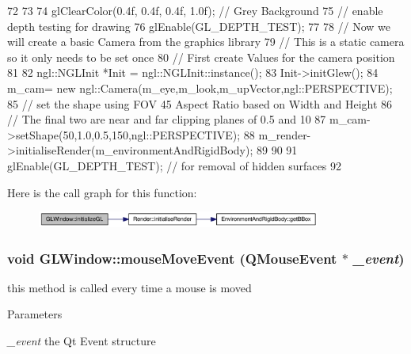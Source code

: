 \begin{DoxyCode}
72 {
73 
74   glClearColor(0.4f, 0.4f, 0.4f, 1.0f);                    // Grey Background
75   // enable depth testing for drawing
76   glEnable(GL_DEPTH_TEST);
77 
78    // Now we will create a basic Camera from the graphics library
79    // This is a static camera so it only needs to be set once
80    // First create Values for the camera position
81 
82    ngl::NGLInit *Init = ngl::NGLInit::instance();
83    Init->initGlew();
84    m_cam= new ngl::Camera(m_eye,m_look,m_upVector,ngl::PERSPECTIVE);
85    // set the shape using FOV 45 Aspect Ratio based on Width and Height
86    // The final two are near and far clipping planes of 0.5 and 10
87    m_cam->setShape(50,1.0,0.5,150,ngl::PERSPECTIVE);
88    m_render->initialiseRender(m_environmentAndRigidBody);
89 
90 
91    glEnable(GL_DEPTH_TEST); // for removal of hidden surfaces
92 }
\end{DoxyCode}




Here is the call graph for this function:\nopagebreak
\begin{figure}[H]
\begin{center}
\leavevmode
\includegraphics[width=264pt]{class_g_l_window_a39e39761cd7323806917a217cc7caea5_cgraph}
\end{center}
\end{figure}


\hypertarget{class_g_l_window_a7a04e2a3400fa69d1bcb6b650425c01e}{
\subsubsection[{mouseMoveEvent}]{\setlength{\rightskip}{0pt plus 5cm}void GLWindow::mouseMoveEvent (QMouseEvent $\ast$ {\em \_\-event})}}
\label{class_g_l_window_a7a04e2a3400fa69d1bcb6b650425c01e}


this method is called every time a mouse is moved 


\begin{DoxyParams}{Parameters}
\item[{\em \_\-event}]the Qt Event structure \end{DoxyParams}


